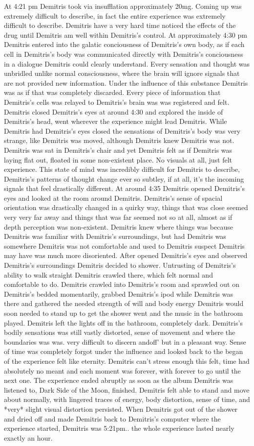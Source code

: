 \documentclass[12pt]{book}
\begin{document}
At 4:21 pm Demitris took via insufflation approximately 20mg. Coming up was extremely difficult to describe, in fact the entire experience was extremely difficult to describe. Demitris have a very hard time noticed the effects of the drug until Demitris am well within Demitris's control. At approximately 4:30 pm Demitris entered into the galatic conciousness of Demitris's own body, as if each cell in Demitris's body was communicated directly with Demitris's conciousness in a dialogue Demitris could clearly understand. Every sensation and thought was unbridled unlike normal consciousness, where the brain will ignore signals that are not provided new information. Under the influence of this substance Demitris was as if that was completely discarded. Every piece of information that Demitris's cells was relayed to Demitris's brain was was registered and felt. Demitris closed Demitris's eyes at around 4:30 and explored the inside of Demitris's head, went wherever the experience might lead Demitris. While Demitris had Demitris's eyes closed the sensations of Demitris's body was very strange, like Demitris was moved, although Demitris knew Demitris was not. Demitris was sat in Demitris's chair and yet Demitris felt as if Demitris was laying flat out, floated in some non-existent place. No visuals at all, just felt experience. This state of mind was incredibly difficult for Demitris to describe, Demitris's patterns of thought change ever so subtley, if at all, it's the incoming signals that feel drastically different. At around 4:35 Demitris opened Demitris's eyes and looked at the room around Demitris. Demitris's sense of spacial orientation was drastically changed in a quirky way, things that was close seemed very very far away and things that was far seemed not so at all, almost as if depth perception was non-existent. Demitris knew where things was because Demitris was familiar with Demitris's surroundings, but had Demitris was somewhere Demitris was not comfortable and used to Demitris suspect Demitris may have was much more disoriented. After opened Demitris's eyes and observed Demitris's surroundings Demitris decided to shower. Untrusting of Demitris's ability to walk straight Demitris crawled there, which felt normal and comfortable to do. Demitris crawled into Demitris's room and sprawled out on Demitris's bedded momentarily, grabbed Demitris's ipod while Demitris was there and gathered the needed strength of will and body energy Demitris would soon needed to stand up to get the shower went and the music in the bathroom played. Demitris left the lights off in the bathroom, completely dark. Demitris's bodily sensations was still vastly distorted, sense of movement and where the boundaries was was. very difficult to discern andoff' but in a pleasant way. Sense of time was completely forgot under the influence and looked back to the began of the experience felt like eternity. Demitris can't stress enough this felt, time had absolutely no meant and each moment was forever, with forever to go until the next one. The experience ended abruptly as soon as the album Demitris was listened to, Dark Side of the Moon, finished. Demitris felt able to stand and move about normally, with lingered traces of energy, body distortion, sense of time, and *very* slight visual distortion persisted. When Demitris got out of the shower and dried off and made Demitris back to Demitris's computer where the experience started, Demitris was 5:21pm.. the whole experience lasted nearly exactly an hour.
\end{document}
